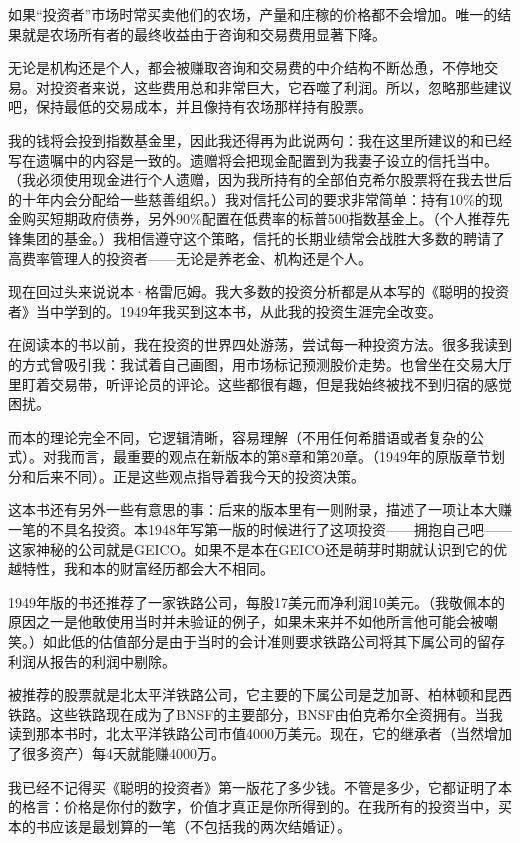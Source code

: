 \documentclass[UTF8,a4paper,zihao=-4,fontset = windows]{ctexart} %
\begin{document}
如果“投资者”市场时常买卖他们的农场，产量和庄稼的价格都不会增加。唯一的结果就是农场所有者的最终收益由于咨询和交易费用显著下降。

无论是机构还是个人，都会被赚取咨询和交易费的中介结构不断怂恿，不停地交易。对投资者来说，这些费用总和非常巨大，它吞噬了利润。所以，忽略那些建议吧，保持最低的交易成本，并且像持有农场那样持有股票。

我的钱将会投到指数基金里，因此我还得再为此说两句：我在这里所建议的和已经写在遗嘱中的内容是一致的。遗赠将会把现金配置到为我妻子设立的信托当中。（我必须使用现金进行个人遗赠，因为我所持有的全部伯克希尔股票将在我去世后的十年内会分配给一些慈善组织。）我对信托公司的要求非常简单：持有10\%的现金购买短期政府债券，另外90\%配置在低费率的标普500指数基金上。（个人推荐先锋集团的基金。）我相信遵守这个策略，信托的长期业绩常会战胜大多数的聘请了高费率管理人的投资者——无论是养老金、机构还是个人。

现在回过头来说说本·格雷厄姆。我大多数的投资分析都是从本写的《聪明的投资者》当中学到的。1949年我买到这本书，从此我的投资生涯完全改变。

在阅读本的书以前，我在投资的世界四处游荡，尝试每一种投资方法。很多我读到的方式曾吸引我：我试着自己画图，用市场标记预测股价走势。也曾坐在交易大厅里盯着交易带，听评论员的评论。这些都很有趣，但是我始终被找不到归宿的感觉困扰。

而本的理论完全不同，它逻辑清晰，容易理解（不用任何希腊语或者复杂的公式）。对我而言，最重要的观点在新版本的第8章和第20章。（1949年的原版章节划分和后来不同）。正是这些观点指导着我今天的投资决策。

这本书还有另外一些有意思的事：后来的版本里有一则附录，描述了一项让本大赚一笔的不具名投资。本1948年写第一版的时候进行了这项投资——拥抱自己吧——这家神秘的公司就是GEICO。如果不是本在GEICO还是萌芽时期就认识到它的优越特性，我和本的财富经历都会大不相同。

1949年版的书还推荐了一家铁路公司，每股17美元而净利润10美元。（我敬佩本的原因之一是他敢使用当时并未验证的例子，如果未来并不如他所言他可能会被嘲笑。）如此低的估值部分是由于当时的会计准则要求铁路公司将其下属公司的留存利润从报告的利润中剔除。

被推荐的股票就是北太平洋铁路公司，它主要的下属公司是芝加哥、柏林顿和昆西铁路。这些铁路现在成为了BNSF的主要部分，BNSF由伯克希尔全资拥有。当我读到那本书时，北太平洋铁路公司市值4000万美元。现在，它的继承者（当然增加了很多资产）每4天就能赚4000万。

我已经不记得买《聪明的投资者》第一版花了多少钱。不管是多少，它都证明了本的格言：价格是你付的数字，价值才真正是你所得到的。在我所有的投资当中，买本的书应该是最划算的一笔（不包括我的两次结婚证）。
\end{document}
